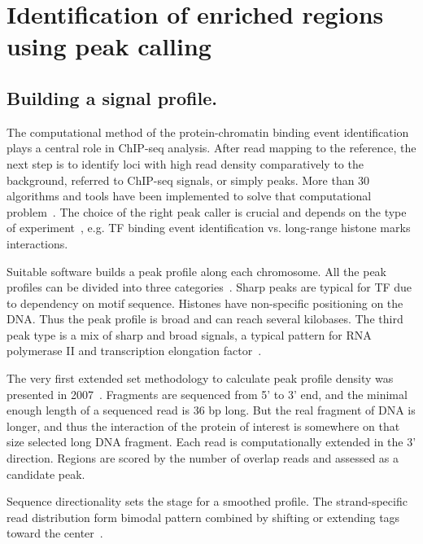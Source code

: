 \chapter{Identification of enriched regions using peak calling}

\section{Building a signal profile.}

The computational method of the protein-chromatin binding event identification plays a central role in ChIP-seq analysis. 
After read mapping to the reference, the next step is to identify loci with high read density comparatively to the background, referred to ChIP-seq signals, or simply peaks.
More than 30 algorithms and tools have been implemented to solve that computational problem~\cite{chen2012systematic}.
The choice of the right peak caller is crucial and depends on the type of experiment~\cite{nakato2017recent}, e.g. TF binding event identification vs. long-range histone marks interactions.

Suitable software builds a peak profile along each chromosome. 
All the peak profiles can be divided into three categories~\cite{park2009chip}. 
Sharp peaks are typical for TF due to dependency on motif sequence. 
Histones have non-specific positioning on the DNA. 
Thus the peak profile is broad and can reach several kilobases. 
The third peak type is a mix of sharp and broad signals, a typical pattern for RNA polymerase II and transcription elongation factor~\cite{lin2011dynamic}.

The very first extended set methodology to calculate peak profile density was presented in 2007~\cite{robertson2007genome}. 
Fragments are sequenced from 5' to 3' end, and the minimal enough length of a sequenced read is 36 bp long. 
But the real fragment of DNA is longer, and thus the interaction of the protein of interest is somewhere on that size selected long DNA fragment. 
Each read is computationally extended in the 3' direction. 
Regions are scored by the number of overlap reads and assessed as a candidate peak.

Sequence directionality sets the stage for a smoothed profile. 
The strand-specific read distribution form bimodal pattern combined by shifting or extending tags toward the center~\cite{valouev2008genome}.

